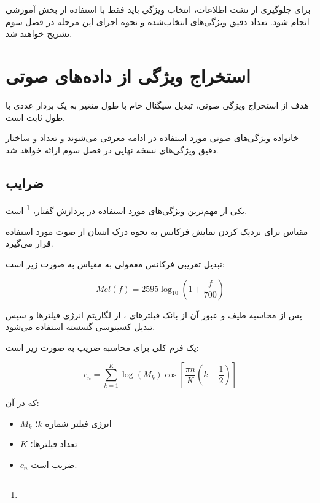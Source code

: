 \documentclass[12pt,a4paper,oneside]{report}
\begin{document}
برای جلوگیری از نشت اطلاعات، انتخاب ویژگی باید فقط با استفاده از بخش آموزشی انجام شود. تعداد دقیق ویژگی‌های انتخاب‌شده و نحوه اجرای این مرحله در فصل سوم تشریح خواهند شد.

\section{استخراج ویژگی از داده‌های صوتی}

هدف از استخراج ویژگی صوتی، تبدیل سیگنال خام با طول متغیر به یک بردار عددی با طول ثابت است.

خانواده ویژگی‌های صوتی مورد استفاده در ادامه معرفی می‌شوند و تعداد و ساختار دقیق ویژگی‌های نسخه نهایی در فصل سوم ارائه خواهد شد.


\subsection{ضرایب }

یکی از مهم‌ترین ویژگی‌های مورد استفاده در پردازش گفتار،
\footnote{}
است.

مقیاس
برای نزدیک کردن نمایش فرکانس به نحوه درک انسان از صوت مورد استفاده قرار می‌گیرد.

تبدیل تقریبی فرکانس معمولی به مقیاس
به صورت زیر است:

\begin{equation}
Mel(f)
=
2595
\log_{10}
\left(
1+\frac{f}{700}
\right)
\end{equation}

پس از محاسبه طیف و عبور آن از بانک فیلترهای
،
از لگاریتم انرژی فیلترها و سپس تبدیل کسینوسی گسسته استفاده می‌شود.

یک فرم کلی برای محاسبه ضریب
به صورت زیر است:

\begin{equation}
c_n
=
\sum_{k=1}^{K}
\log(M_k)
\cos
\left[
\frac{\pi n}{K}
\left(
k-\frac{1}{2}
\right)
\right]
\end{equation}

که در آن:

\begin{itemize}
	\item $M_k$ انرژی فیلتر  شماره $k$؛
	\item $K$ تعداد فیلترها؛
	\item $c_n$ ضریب  است.
\end{itemize}
\end{document}
